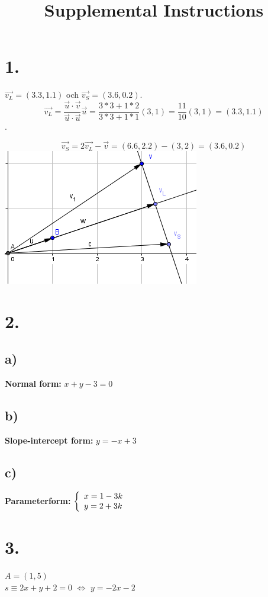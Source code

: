 \documentclass{article}
\title{Supplemental Instructions}
\date{
     }
\begin{document}
\maketitle


\section*{1.}
$\vec{v_L} = (3.3, 1.1)$ och $\vec{v_S} = (3.6, 0.2)$. 
\[\vec{v_L} = \frac{\vec{u} \cdot \vec{v}}{\vec{u} \cdot \vec{u}}\vec{u}
= \frac{3*3+1*2}{3*3+1*1} (3,1) = \frac{11}{10} (3, 1) = (3.3, 1.1)\]. 

\[\vec{v_S} = 2\vec{v_L} - \vec{v} = (6.6, 2.2) - (3, 2) = (3.6, 0.2)\]
\newline  
\includegraphics[scale=0.75]{graph_ans_3}

\section*{2.}
\subsection*{a)}
{\bf Normal form: }
$x+y-3=0$

\subsection*{b)}
{\bf Slope-intercept form: }
$y=-x+3$

\subsection*{c)}
{\bf Parameterform: }
$\left\{
\begin{array}{l l}
    x=1-3k\\
    y=2+3k
\end{array}\right.$

\section*{3.}
$A=(1,5)$\\
$s \equiv 2x+y+2=0$ $\Leftrightarrow$ $y=-2x-2$
\end{document}
